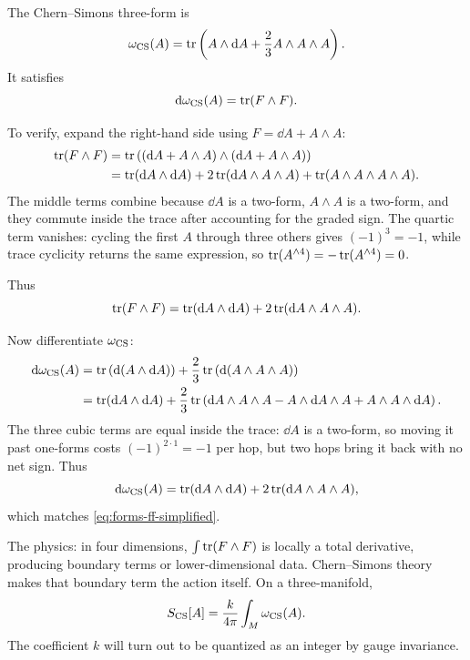 The Chern--Simons three-form is
\begin{equation}
  \omega_{\operatorname{CS}}(A)
  =
  \operatorname{tr}\left(A\wedge\mathrm{d} A+\frac23 A\wedge A\wedge A\right).
  \label{eq:forms-cs-three-form}
\end{equation}
It satisfies
\begin{equation}
  \mathrm{d}\omega_{\operatorname{CS}}(A)=\operatorname{tr}(F\wedge F).
  \label{eq:forms-transgression}
\end{equation}

To verify, expand the right-hand side using $F=\dd A+A\wedge A$:
\begin{align}
  \operatorname{tr}(F\wedge F)
  &=
  \operatorname{tr}\left((\mathrm{d} A+A\wedge A)\wedge(\mathrm{d} A+A\wedge A)\right)
  \notag\\
  &=
  \operatorname{tr}(\mathrm{d} A\wedge\mathrm{d} A)
  +2\operatorname{tr}(\mathrm{d} A\wedge A\wedge A)
  +\operatorname{tr}(A\wedge A\wedge A\wedge A).
  \label{eq:forms-ff-expand}
\end{align}
The middle terms combine because $\dd A$ is a two-form, $A\wedge A$ is a two-form, and they commute inside the trace after accounting for the graded sign. The quartic term vanishes: cycling the first $A$ through three others gives $(-1)^3=-1$, while trace cyclicity returns the same expression, so $\operatorname{tr}(A^{\wedge 4})=-\operatorname{tr}(A^{\wedge 4})=0$.

Thus
\begin{equation}
  \operatorname{tr}(F\wedge F)
  =
  \operatorname{tr}(\mathrm{d} A\wedge\mathrm{d} A)
  +
  2\operatorname{tr}(\mathrm{d} A\wedge A\wedge A).
  \label{eq:forms-ff-simplified}
\end{equation}

Now differentiate $\omega_{\operatorname{CS}}$:
\begin{align}
  \mathrm{d}\omega_{\operatorname{CS}}(A)
  &=
  \operatorname{tr}\left(\mathrm{d}(A\wedge\mathrm{d} A)\right)
  +
  \frac23\operatorname{tr}\left(\mathrm{d}(A\wedge A\wedge A)\right)
  \notag\\
  &=
  \operatorname{tr}(\mathrm{d} A\wedge\mathrm{d} A)
  +
  \frac23\operatorname{tr}\left(\mathrm{d} A\wedge A\wedge A
  -A\wedge\mathrm{d} A\wedge A
  +A\wedge A\wedge\mathrm{d} A\right).
  \label{eq:forms-dcs-expand}
\end{align}
The three cubic terms are equal inside the trace: $\dd A$ is a two-form, so moving it past one-forms costs $(-1)^{2\cdot 1}=-1$ per hop, but two hops bring it back with no net sign. Thus
\begin{equation}
  \mathrm{d}\omega_{\operatorname{CS}}(A)
  =
  \operatorname{tr}(\mathrm{d} A\wedge\mathrm{d} A)
  +
  2\operatorname{tr}(\mathrm{d} A\wedge A\wedge A),
  \label{eq:forms-dcs-final}
\end{equation}
which matches \eqref{eq:forms-ff-simplified}.

The physics: in four dimensions, $\int\operatorname{tr}(F\wedge F)$ is locally a total derivative, producing boundary terms or lower-dimensional data. Chern--Simons theory makes that boundary term the action itself. On a three-manifold,
\begin{equation}
  S_{\operatorname{CS}}[A]
  =
  \frac{k}{4\pi}\int_M\omega_{\operatorname{CS}}(A).
  \label{eq:forms-cs-action}
\end{equation}
The coefficient $k$ will turn out to be quantized as an integer by gauge invariance.


